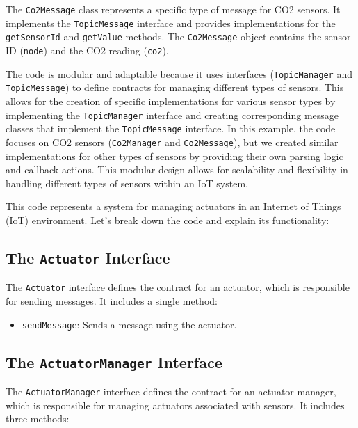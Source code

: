 \documentclass[parskip=full]{report}
\begin{document}
	The \texttt{Co2Message} class represents a specific type of message for CO2 sensors. It implements the \texttt{TopicMessage} interface and provides implementations for the \texttt{getSensorId} and \texttt{getValue} methods. The \texttt{Co2Message} object contains the sensor ID (\texttt{node}) and the CO2 reading (\texttt{co2}).
	
	The code is modular and adaptable because it uses interfaces (\texttt{TopicManager} and \texttt{TopicMessage}) to define contracts for managing different types of sensors. This allows for the creation of specific implementations for various sensor types by implementing the \texttt{TopicManager} interface and creating corresponding message classes that implement the \texttt{TopicMessage} interface. In this example, the code focuses on CO2 sensors (\texttt{Co2Manager} and \texttt{Co2Message}), but we created similar implementations for other types of sensors by providing their own parsing logic and callback actions. This modular design allows for scalability and flexibility in handling different types of sensors within an IoT system.
	
	

		

		
		This code represents a system for managing actuators in an Internet of Things (IoT) environment. Let's break down the code and explain its functionality:
		
		\subsection{The \texttt{Actuator} Interface}
		
		The \texttt{Actuator} interface defines the contract for an actuator, which is responsible for sending messages. It includes a single method:
		
		\begin{itemize}
			\item \texttt{sendMessage}: Sends a message using the actuator.
		\end{itemize}
		
		\subsection{The \texttt{ActuatorManager} Interface}
		
		The \texttt{ActuatorManager} interface defines the contract for an actuator manager, which is responsible for managing actuators associated with sensors. It includes three methods:
		
\end{document}
